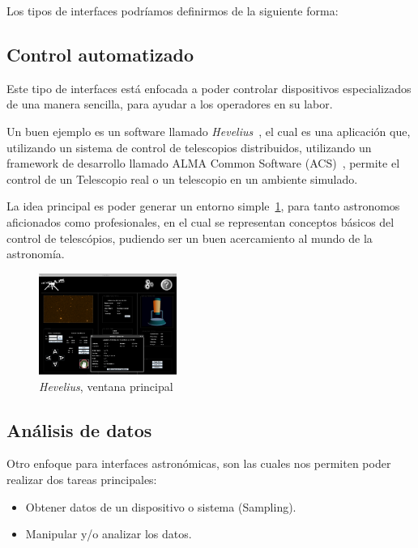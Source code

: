 Los tipos de interfaces podríamos definirmos de la siguiente forma:

\subsection{Control automatizado}

Este tipo de interfaces está enfocada a poder controlar dispositivos
especializados de una manera sencilla, para ayudar a los operadores
en su labor.

Un buen ejemplo es un software llamado \emph{Hevelius}~\cite{hevelius},
el cual es una aplicación que, utilizando un sistema de control
de telescopios distribuidos, utilizando un framework de desarrollo
llamado ALMA Common Software (ACS)~\cite{acs},
permite el control de un Telescopio real o un telescopio en un ambiente
simulado.

La idea principal es poder generar un entorno simple~\ref{fig:hevelius},
para tanto astronomos aficionados como profesionales,
en el cual se representan conceptos básicos del control de telescópios,
pudiendo ser un buen acercamiento al mundo de la astronomía.

\begin{figure}[!htb]
\begin{center}
    \includegraphics[width=0.4\textwidth]{img/hevelius}
    \caption{\emph{Hevelius}, ventana principal}
    \label{fig:hevelius}
\end{center}
\end{figure}

\subsection{Análisis de datos}

Otro enfoque para interfaces astronómicas, son las cuales nos permiten
poder realizar dos tareas
principales:
\begin{itemize}
    \item Obtener datos de un dispositivo o sistema (Sampling).
    \item Manipular y/o analizar los datos.
\end{itemize}

